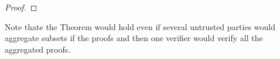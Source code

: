 \begin{proof}

\end{proof}

Note thate the Theorem would hold even if several untrusted parties would aggregate subsets if the proofs and then one verifier would verify all the aggregated proofs. 








 
